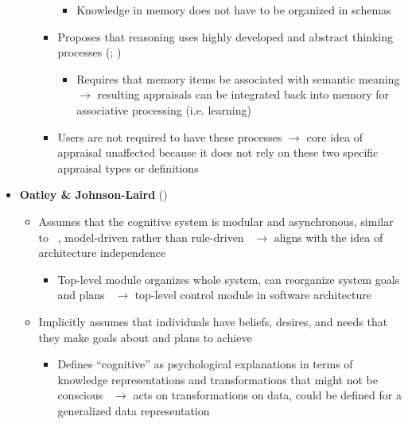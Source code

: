 \begin{itemize}
\begin{itemize}
\begin{itemize}
\begin{itemize}
                \item Knowledge in memory does not have to be organized in
                schemas
            \end{itemize}

            \item Proposes that reasoning uses highly developed and abstract
            thinking processes (;
            )
            \begin{itemize}
                \item Requires that memory items be associated with semantic
                meaning $\rightarrow$ resulting appraisals can be integrated
                back into memory for associative processing (i.e.
                learning)
            \end{itemize}

            \item Users are not required to have these processes $\rightarrow$
            core idea of appraisal unaffected because it does not rely on these
            two specific appraisal types or definitions
        \end{itemize}
    \end{itemize}

    \item \textbf{Oatley \& Johnson-Laird} (\strong)
    \begin{itemize}
        \item Assumes that the cognitive system is modular and asynchronous,
        similar to
        \citet{minsky1988society}~\citep[p.~31--32]{oatley1987towards},
        model-driven rather than
        rule-driven~\citep[p.~205--206]{johnson1992basic} $\rightarrow$ aligns
        with the idea of architecture independence
        \begin{itemize}
            \item Top-level module organizes whole system, can reorganize
            system goals and plans~\citep[p.~50--51]{oatley1992best}
            $\rightarrow$ top-level control module in software architecture
        \end{itemize}

        \item Implicitly assumes that individuals have beliefs, desires, and
        needs that they make goals about and plans to
        achieve~\citep[p.~213]{johnson1992basic}
        \begin{itemize}
            \item Defines ``cognitive'' as psychological explanations in terms
            of knowledge representations and transformations that might not be
            conscious~\citep[p.~30]{oatley1987towards} $\rightarrow$ acts on
            transformations on data, could be defined for a generalized data
            representation


\end{itemize}
\end{itemize}
\end{itemize}
